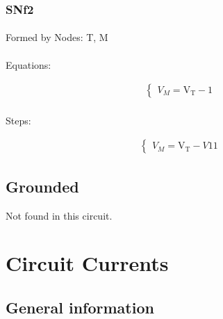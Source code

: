 \documentclass[a4paper]{article}
\begin{document}
\subsubsection{SNf2}

\paragraph{} Formed by Nodes: {T, M}
\par

\paragraph{} Equations:

\begin{gather*}
\begin{cases}
V_{M} = \mathrm{V_{T}}-1
\end{cases}
\end{gather*}
\par

\paragraph{} Steps:

\begin{gather*}
\begin{cases}V_{M} = \mathrm{V_{T}}- V11\end{cases}
\end{gather*}
\par

\subsection{Grounded}
Not found in this circuit.

\newpage
\section{Circuit Currents}

\subsection{General information}
\end{document}
